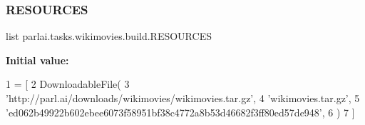 \subsubsection{\texorpdfstring{R\+E\+S\+O\+U\+R\+C\+ES}{RESOURCES}}
{\footnotesize\ttfamily list parlai.\+tasks.\+wikimovies.\+build.\+R\+E\+S\+O\+U\+R\+C\+ES}

{\bfseries Initial value\+:}
\begin{DoxyCode}
1 =  [
2     DownloadableFile(
3         \textcolor{stringliteral}{'http://parl.ai/downloads/wikimovies/wikimovies.tar.gz'},
4         \textcolor{stringliteral}{'wikimovies.tar.gz'},
5         \textcolor{stringliteral}{'ed062b49922b602ebee6073f58951bf38c4772a8b53d46682f3ff80ed57de948'},
6     )
7 ]
\end{DoxyCode}
